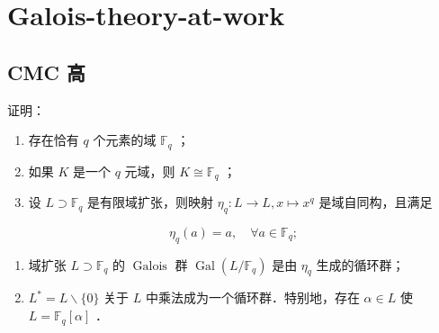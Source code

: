 \section{Galois-theory-at-work}

\subsection{CMC 高}

\begin{exercise}
证明：
	\begin{enumerate}
		\item 存在恰有 $q$ 个元素的域 $\mathbb{F}_q$ ；
		\item 如果 $K$ 是一个 $q$ 元域，则 $K \cong \mathbb{F}_q$ ；
		\item 设 $L \supset \mathbb{F}_q$ 是有限域扩张，则映射 $\eta_q: L \rightarrow L, x \mapsto x^q$ 是域自同构，且满足
	\end{enumerate}
\[
\eta_q(a)=a, \quad \forall a \in \mathbb{F}_q ;
\]	\begin{enumerate}
		\item 域扩张 $L \supset \mathbb{F}_q$ 的 $\operatorname{Galois}$ 群 $\operatorname{Gal}\left(L / \mathbb{F}_q\right)$ 是由 $\eta_q$ 生成的循环群；
		\item $L^*=L \backslash\{0\}$ 关于 $L$ 中乘法成为一个循环群．特别地，存在 $\alpha \in L$ 使 $L=\mathbb{F}_q[\alpha]$ ．
	\end{enumerate}
\end{exercise}
